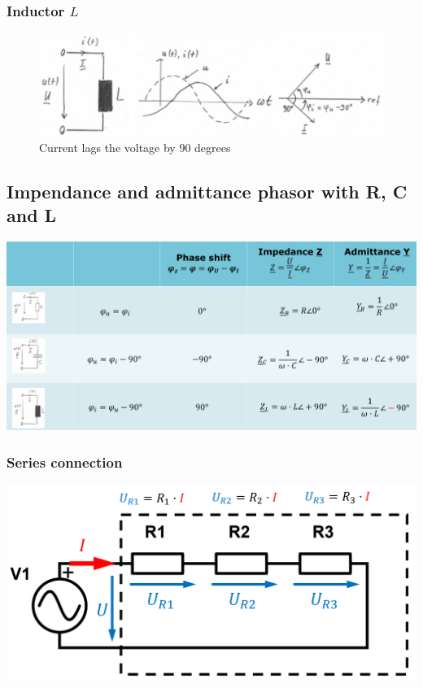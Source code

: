 \documentclass{article}
\begin{document}
\subsubsection{Inductor $L$}


\begin{figure}[ht!]
    \begin{center}
        \includegraphics[width=.6\textwidth]{media/inductive_reactance.png}
        \caption*{Current lags the voltage by 90 degrees}
    \end{center}
\end{figure}

\subsection{Impendance and admittance phasor with R, C and L}
\begin{center}
    \includegraphics[width=\textwidth]{media/impedance_admittance.png}
\end{center}

\subsubsection{Series connection}
\begin{center}
    \includegraphics[width=.5\textwidth]{media/series_resistances.png}
\end{center}
\end{document}
